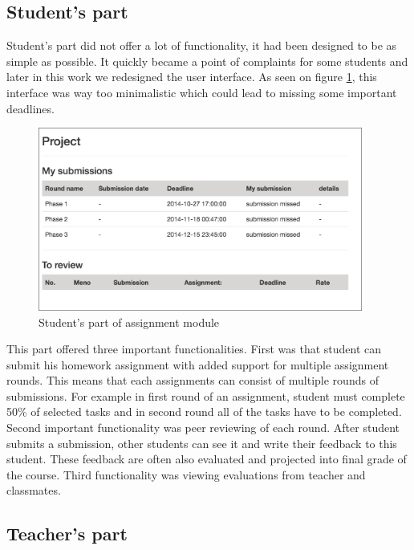 \subsection{Student's part}

Student's part did not offer a lot of functionality, it had been designed to be as simple as possible. It quickly became a point of complaints for some students and later in this work we redesigned the user interface. As seen on figure \ref{assstudent}, this interface was way too minimalistic which could lead to missing some important deadlines.

\begin{figure}[h]
    \centering
    \includegraphics[width=0.95\textwidth]{images/assstudent.png}
    \caption{Student's part of assignment module}
    \label{assstudent}
\end{figure}


This part offered three important functionalities. First was that student can submit his homework assignment with added support for multiple assignment rounds. This means that each assignments can consist of multiple rounds of submissions. For example in first round of an assignment, student must complete 50\% of selected tasks and in second round all of the tasks have to be completed. Second important functionality was peer reviewing of each round. After student submits a submission, other students can see it and write their feedback to this student. These feedback are often also evaluated and projected into final grade of the course. Third functionality was viewing evaluations from teacher and classmates.

\subsection{Teacher's part}

